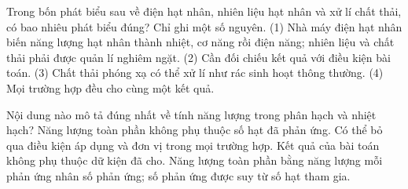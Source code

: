 \begin{ex}
Trong bốn phát biểu sau về điện hạt nhân, nhiên liệu hạt nhân và xử lí chất thải, có bao nhiêu phát biểu đúng? Chỉ ghi một số nguyên. (1) Nhà máy điện hạt nhân biến năng lượng hạt nhân thành nhiệt, cơ năng rồi điện năng; nhiên liệu và chất thải phải được quản lí nghiêm ngặt. (2) Cần đối chiếu kết quả với điều kiện bài toán. (3) Chất thải phóng xạ có thể xử lí như rác sinh hoạt thông thường. (4) Mọi trường hợp đều cho cùng một kết quả.
\end{ex}

\begin{ex}
Nội dung nào mô tả đúng nhất về tính năng lượng trong phân hạch và nhiệt hạch?
\choice
{Năng lượng toàn phần không phụ thuộc số hạt đã phản ứng.}
{Có thể bỏ qua điều kiện áp dụng và đơn vị trong mọi trường hợp.}
{Kết quả của bài toán không phụ thuộc dữ kiện đã cho.}
{\True Năng lượng toàn phần bằng năng lượng mỗi phản ứng nhân số phản ứng; số phản ứng được suy từ số hạt tham gia.}
\end{ex}

